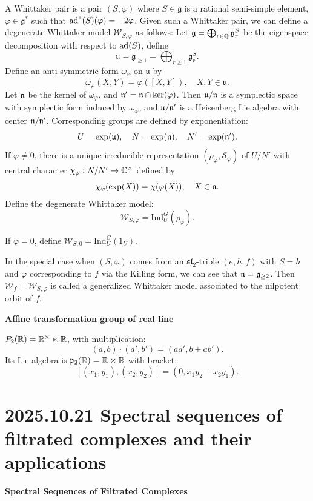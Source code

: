 \documentclass[12pt]{amsart}
\numberwithin{equation}{section}
\newcommand{\fg}{\mathfrak{g}} \newcommand{\fh}{\mathfrak{h}} \newcommand{\fk}{\mathfrak{k}}
\newcommand{\fu}{\mathfrak{u}} \newcommand{\fv}{\mathfrak{v}} \newcommand{\fy}{\mathfrak{y}}
\begin{document}
A Whittaker pair is a pair $(S,\varphi)$ where $S \in \fg$ is a rational semi-simple element, $\varphi \in \fg^*$ such that ${\mathrm{ad}}^*(S)(\varphi) = -2\varphi$. Given such a Whittaker pair, we can define a degenerate Whittaker model $\mathcal{W}_{S,\varphi}$ as follows:
Let $\fg = \bigoplus_{r \in \BQ} \fg^S_r$ be the eigenspace decomposition with respect to ${\mathrm{ad}}(S)$, define
\[ \fu = \fg_{\geq 1} = \bigoplus_{r \geq 1} \fg^S_r.\]
Define an anti-symmetric form $\omega_{\varphi}$ on $\fu$ by
\[\omega_{\varphi}(X,Y) = \varphi([X,Y]), \quad X,Y \in \fu.\]
Let $\mathfrak{n}$ be the kernel of $\omega_{\varphi}$, and $\mathfrak{n}' = \mathfrak{n} \cap \ker(\varphi)$. Then $\fu/\fn$ is a symplectic space with symplectic form induced by $\omega_{\varphi}$, and $\fu/\fn'$ is a Heisenberg Lie algebra with center $\mathfrak{n}/\mathfrak{n}'$. Corresponding groups are defined by exponentiation:
\[U = \exp(\fu), \quad N = \exp(\fn), \quad N' = \exp(\fn').\]
If $\varphi \neq 0$, there is a unique irreducible representation $(\rho_{\varphi},\mathcal{S}_{\varphi})$ of $U/N'$ with central character $\chi_{\varphi} : N/N' \to {\mathbb {C}}^{\times}$ defined by \[\chi_{\varphi}(\exp(X)) = \chi(\varphi(X)), \quad X \in \mathfrak{n}.\]
Define the degenerate Whittaker model:
\[\mathcal{W}_{S,\varphi} = \mathrm{Ind}_U^G(\rho_{\varphi}).\]

If $\varphi = 0$, define $\mathcal{W}_{S,0} = \mathrm{Ind}_U^G(1_U)$.

\begin{rk}
  In the special case when $(S,\varphi)$ comes from an $\mathfrak{sl}_2$-triple $(e,h,f)$ with $S = h$ and $\varphi$ corresponding to $f$ via the Killing form, we can see that $\fn = \fg_{\geq 2}$. 
  Then $\mathcal{W}_f = \mathcal{W}_{S,\varphi}$ is called a generalized Whittaker model associated to the nilpotent orbit of $f$.
\end{rk}

\textbf{Affine transformation group of real line}

$P_2({\mathbb {R}}) = {\mathbb {R}}^{\times} \ltimes {\mathbb {R}}$, with multiplication:
\[(a,b) \cdot (a',b') = (aa', b + ab').\]
Its Lie algebra is $\mathfrak{p}_2({\mathbb {R}}) = {\mathbb {R}} \times {\mathbb {R}}$ with bracket:
\[[ (x_1,y_1), (x_2,y_2) ] = (0, x_1 y_2 - x_2 y_1).\]



\section{2025.10.21 Spectral sequences of filtrated complexes and their applications}

\textbf{Spectral Sequences of Filtrated Complexes}
\end{document}
